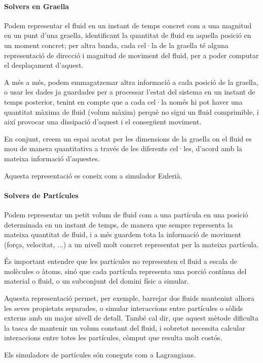 \documentclass[a4paper]{report}
\begin{document}
	\paragraph[Graella]{\quad Solvers en Graella} Podem representar el fluid en un instant de temps concret com a una magnitud en un punt d'una graella, identificant la quantitat de fluid en aquella posició en un moment concret; per altra banda, cada cel·la de la graella té alguna representació de direcció i magnitud de moviment del fluid, per a poder computar el desplaçament d'aquest. \par
	A més a més, podem emmagatzemar altra informació a cada posició de la graella, o usar les dades ja guardades per a processar l'estat del sistema en un instant de temps posterior, tenint en compte que a cada cel·la només hi pot haver una quantitat màxima de fluid (volum màxim) perquè no sigui un fluid comprimible, i així provocar una dissipació d'aquest i el consegüent moviment.\par
	En conjunt, creem un espai acotat per les dimensions de la graella on el fluid es mou de manera quantitativa a través de les diferents cel·les, d'acord amb la mateixa informació d'aquestes. \par
	Aquesta representació es coneix com a simulador Eulerià.
	
	\paragraph[Partícules]{\quad Solvers de Partícules} Podem representar un petit volum de fluid com a una partícula en una posició determinada en un instant de temps, de manera que sempre representa la mateixa quantitat de fluid, i a més guardem tota la informació de moviment (força, velocitat, ...) a un nivell molt concret representat per la mateixa partícula. \par
	És important entendre que les partícules no representen el fluid a escala de molècules o àtoms, sinó que cada partícula representa una porció contínua del material o fluid, o un subconjunt del domini físic a simular.
	\par
	Aquesta representació permet, per exemple, barrejar dos fluids mantenint alhora les seves propietats separades, o simular interaccions entre partícules o sòlids externs amb un major nivell de detall.
	També cal dir, que aquest mètode dificulta la tasca de mantenir un volum constant del fluid, i sobretot necessita calcular interaccions entre totes les partícules, còmput que resulta molt costós. \par
	Els simuladors de partícules són coneguts com a Lagrangians.
	
\end{document}
